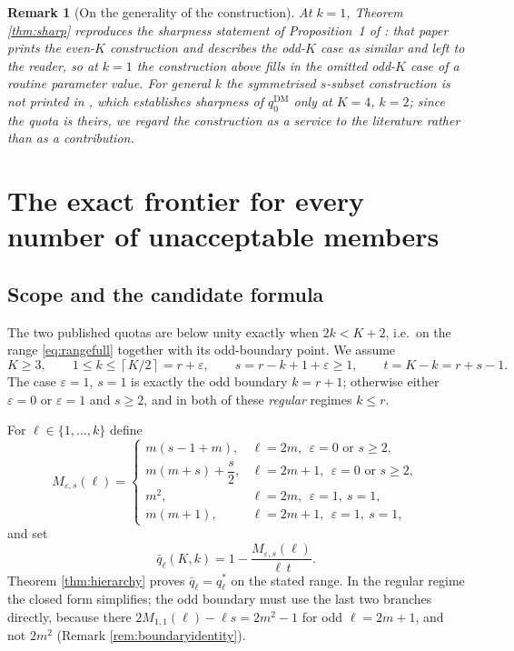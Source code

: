\documentclass[11pt]{article}
\theoremstyle{plain}
\newtheorem{remark}{Remark}
\theoremstyle{definition}
\newcommand{\cl}[1]{\left\lceil #1\right\rceil}
\newcommand{\eps}{\varepsilon}
\newcommand{\DM}{\mathrm{DM}}
\begin{document}
\begin{remark}[On the generality of the construction]
\label{rem:generality}
At $k=1$, Theorem \ref{thm:sharp} reproduces the sharpness statement of Proposition~1 of \cite{MahajneVolij2019}: that paper prints the even-$K$ construction and describes the odd-$K$ case as similar and left to the reader, so at $k=1$ the construction above fills in the omitted odd-$K$ case of a routine parameter value. For general $k$ the sym\-metrised $s$-subset construction is not printed in \cite{DissMahajne2019}, which establishes sharpness of $q_0^{\DM}$ only at $K=4$, $k=2$; since the quota is theirs, we regard the construction as a service to the literature rather than as a contribution.
\end{remark}

\section{The exact frontier for every number of unacceptable members}
\label{sec:hierarchy}

\subsection{Scope and the candidate formula}

The two published quotas are below unity exactly when $2k<K+2$, i.e.\ on the range \eqref{eq:rangefull} together with its odd-boundary point. We assume
\[
K\ge3,\qquad 1\le k\le \cl{K/2}=r+\eps,\qquad s=r-k+1+\eps\ge1,\qquad t=K-k=r+s-1 .
\]
The case $\eps=1$, $s=1$ is exactly the odd boundary $k=r+1$; otherwise either $\eps=0$ or $\eps=1$ and $s\ge2$, and in both of these \emph{regular} regimes $k\le r$.

For $\ell\in\{1,\dots,k\}$ define
\begin{equation}
\label{eq:M}
M_{\eps,s}(\ell)=
\begin{cases}
m(s-1+m), & \ell=2m,\ \ \eps=0\text{ or }s\ge2,\\[4pt]
m(m+s)+\dfrac{s}{2}, & \ell=2m+1,\ \ \eps=0\text{ or }s\ge2,\\[10pt]
m^{2}, & \ell=2m,\ \ \eps=1,\ s=1,\\[4pt]
m(m+1), & \ell=2m+1,\ \ \eps=1,\ s=1,
\end{cases}
\end{equation}
and set
\begin{equation}
\label{eq:candidate}
\bar q_\ell(K,k)=1-\frac{M_{\eps,s}(\ell)}{\ell\,t}.
\end{equation}
Theorem \ref{thm:hierarchy} proves $\bar q_\ell=q_\ell^*$ on the stated range. In the regular regime the closed form simplifies; the odd boundary must use the last two branches directly, because there $2M_{1,1}(\ell)-\ell s=2m^2-1$ for odd $\ell=2m+1$, and not $2m^2$ (Remark \ref{rem:boundaryidentity}).
\end{document}
